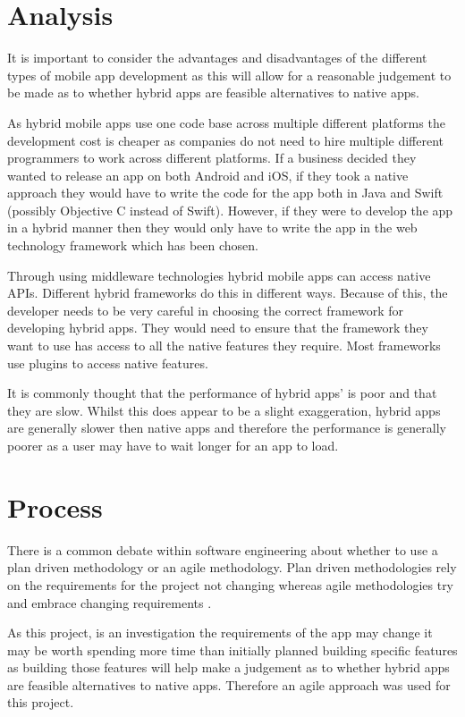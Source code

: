 \section{Analysis}
It is important to consider the advantages and disadvantages of the different types of mobile app development as this will allow for a reasonable judgement to be made as to whether hybrid apps are feasible alternatives to native apps.

As hybrid mobile apps use one code base across multiple different platforms the development cost is cheaper as companies do not need to hire multiple different programmers to work across different platforms. If a business decided they wanted to release an app on both Android and iOS, if they took a native approach they would have to write the code for the app both in Java and Swift (possibly Objective C instead of Swift). However, if they were to develop the app in a hybrid manner then they would only have to write the app in the web technology framework which has been chosen.

Through using middleware technologies hybrid mobile apps can access native APIs. Different hybrid frameworks do this in different ways. Because of this, the developer needs to be very careful in choosing the correct framework for developing hybrid apps. They would need to ensure that the framework they want to use has access to all the native features they require. Most frameworks use plugins to access native features.

It is commonly thought that the performance of hybrid apps' is poor and that they are slow. Whilst this does appear to be a slight exaggeration, hybrid apps are generally slower then native apps and therefore the performance is generally poorer as a user may have to wait longer for an app to load.


\section{Process}
There is a common debate within software engineering about whether to use a plan driven methodology or an agile methodology. Plan driven methodologies rely on the requirements for the project not changing whereas agile methodologies try and embrace changing requirements \cite{Agile}.

As this project, is an investigation the requirements of the app may change it may be worth spending more time than initially planned building specific features as building those features will help make a judgement as to whether hybrid apps are feasible alternatives to native apps. Therefore an agile approach was used for this project.

